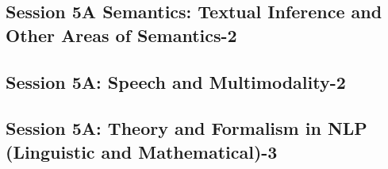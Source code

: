 \subsection{\large Session 5A Semantics: Textual Inference and Other Areas of Semantics-2}
\label{parallel-session-5A-trackF}
\TrackFLoc\hfill\sessionchair{}{}
\clearpage
\subsection{\large Session 5A: Speech and Multimodality-2}
\label{parallel-session-5A-trackG}
\TrackGLoc\hfill\sessionchair{}{}
\clearpage
\subsection{\large Session 5A: Theory and Formalism in NLP (Linguistic and Mathematical)-3}
\label{parallel-session-5A-trackH}
\TrackHLoc\hfill\sessionchair{}{}
\clearpage


